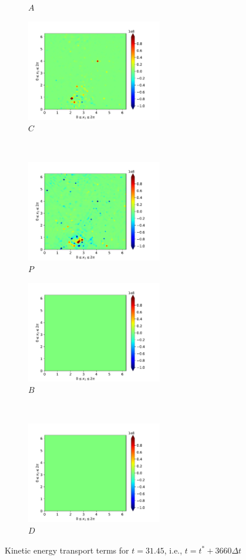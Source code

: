 \begin{figure}[H]
\begin{subfigure}{0.45\textwidth}
        \caption{$A$}
    \end{subfigure}
    \newline
    \begin{subfigure}{0.45\textwidth}
        \includegraphics[height=1.75in]{media/run-cds-65-5k/C-ke-4750.png}
        \caption{$C$}
    \end{subfigure}
    ~
    \begin{subfigure}{0.45\textwidth}
        \includegraphics[height=1.75in]{media/run-cds-65-5k/P-ke-4750.png}
        \caption{$P$}
    \end{subfigure}
    \newline
    \begin{subfigure}{0.45\textwidth}
        \includegraphics[height=1.75in]{media/run-cds-65-5k/B-ke-4750.png}
        \caption{$B$}
    \end{subfigure}
    ~
    \begin{subfigure}{0.45\textwidth}
        \includegraphics[height=1.75in]{media/run-cds-65-5k/D-ke-4750.png}
        \caption{$D$}
    \end{subfigure}
    \caption{Kinetic energy transport terms for $t=31.45$, i.e., $t=t^{\ast} + 3660 \Delta t$}
    \label{fig:ke-4750}
\end{figure}
